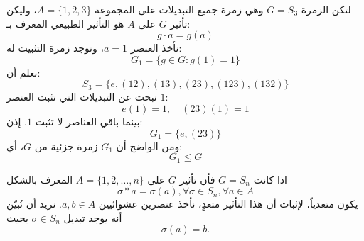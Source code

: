 \begin{example}
	لتكن الزمرة $G = S_3$ وهي زمرة جميع التبديلات على المجموعة $A = \{1,2,3\}$، وليكن تأثير $G$ على $A$ هو التأثير الطبيعي المعرف بـ:
	\[
	g \cdot a = g(a)
	\]
	نأخذ العنصر $a = 1$، ونوجد زمرة التثبيت له:
	\[
	G_1 = \{ g \in G : g(1) = 1 \}
	\]
	نعلم أن:
	\[
	S_3 = \{ e, (12), (13), (23), (123), (132) \}
	\]
	نبحث عن التبديلات التي تثبت العنصر $1$:
	\[
	e(1)=1, \quad (23)(1)=1
	\]
	بينما باقي العناصر لا تثبت $1$.
	إذن:
	\[
	G_1 = \{ e, (23) \}
	\]
	ومن الواضح أن $G_1$ زمرة جزئية من $G$، أي:
	\[
	G_1 \leq G
	\]
\end{example}



\begin{example}
	اذا كانت $G=S_n$ فأن تأثير $G$ على $A = \{1, 2, \dots, n\}$ المعرف بالشكل
	\[
	\sigma * a = \sigma(a), \forall \sigma\in S_n , \forall a\in A
	\]
	يكون متعدياً، لإثبات أن هذا التأثير متعدٍ، نأخذ عنصرين عشوائيين \( a,b \in A \). نريد أن نُبيّن أنه يوجد تبديل \( \sigma \in S_n \) بحيث
	\[
	\sigma(a) = b.
	\]
\end{example}